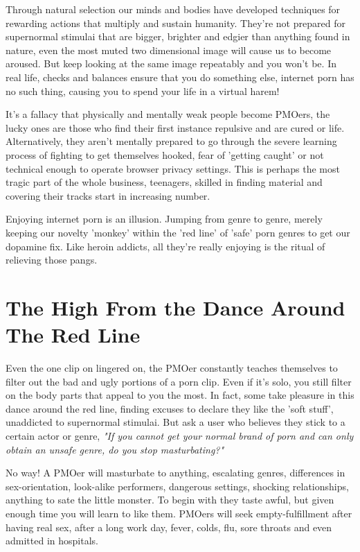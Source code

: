 \documentclass[easypeasy.tex]{subfiles}
\begin{document}
Through natural selection our minds and bodies have developed techniques for rewarding actions that multiply and sustain humanity. They're not prepared for supernormal stimulai that are bigger, brighter and edgier than anything found in nature, even the most muted two dimensional image will cause us to become aroused. But keep looking at the same image repeatably and you won't be. In real life, checks and balances ensure that you do something else, internet porn has no such thing, causing you to spend your life in a virtual harem!

It's a fallacy that physically and mentally weak people become PMOers, the lucky ones are those who find their first instance repulsive and are cured or life. Alternatively, they aren't mentally prepared to go through the severe learning process of fighting to get themselves hooked, fear of 'getting caught' or not technical enough to operate browser privacy settings. This is perhaps the most tragic part of the whole business, teenagers, skilled in finding material and covering their tracks start in increasing number.

Enjoying internet porn is an illusion. Jumping from genre to genre, merely keeping our novelty 'monkey' within the 'red line' of 'safe' porn genres to get our dopamine fix. Like heroin addicts, all they're  really enjoying is the ritual of relieving those pangs.

\section{The High From the Dance Around The Red Line}
Even the one clip on lingered on, the PMOer constantly teaches themselves to filter out the bad and ugly portions of a porn clip. Even if it's solo, you still filter on the body parts that appeal to you the most. In fact, some take pleasure in this dance around the red line, finding excuses to declare they like the 'soft stuff', unaddicted to supernormal stimulai. But ask a user who believes they stick to a certain actor or genre, \textit{"If you cannot get your normal brand of porn and can only obtain an unsafe genre, do you stop masturbating?"}

No way! A PMOer will masturbate to anything, escalating genres, differences in sex-orientation, look-alike performers, dangerous settings, shocking relationships, anything to sate the little monster. To begin with they taste awful, but given enough time you will learn to like them. PMOers will seek empty-fulfillment after having real sex, after a long work day, fever, colds, flu, sore throats and even admitted in hospitals.
\end{document}
